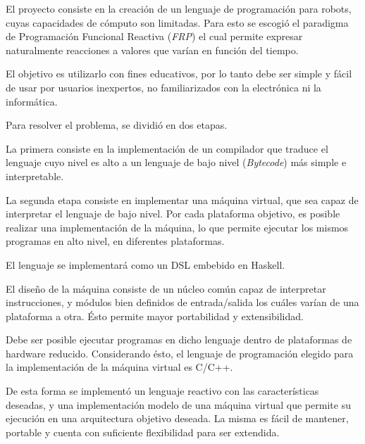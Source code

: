 

El proyecto consiste en la creación de un lenguaje de programación
para robots, cuyas capacidades de cómputo son limitadas.
Para esto se escogió el paradigma de Programación Funcional Reactiva
(\emph{FRP}) el cual permite expresar naturalmente reacciones a
valores que varían en función del tiempo.

El objetivo es utilizarlo con fines educativos,
por lo tanto debe ser simple y fácil de usar por usuarios
inexpertos, no familiarizados con la electrónica ni la informática.

Para resolver el problema, se dividió en dos etapas.

La primera consiste en la implementación de
un compilador que traduce el lenguaje cuyo nivel es alto a
un lenguaje de bajo nivel (\emph{Bytecode}) más simple e interpretable.

La segunda etapa consiste en implementar una máquina virtual, que
sea capaz de interpretar el lenguaje de bajo nivel.
Por cada plataforma objetivo, es posible realizar una implementación de
la máquina, lo que permite ejecutar los mismos
programas en alto nivel, en diferentes plataformas.

El lenguaje se implementará como un DSL embebido en Haskell.

El diseño de la máquina consiste de un núcleo común capaz de interpretar
instrucciones, y módulos bien definidos de
entrada/salida los cuáles varían de una plataforma a otra.
Ésto permite mayor portabilidad y extensibilidad.

Debe ser posible ejecutar programas en dicho lenguaje dentro de plataformas
de hardware reducido.
Considerando ésto, el lenguaje de programación elegido para la
implementación de la máquina virtual es C/C++.

De esta forma se implementó un lenguaje reactivo con las
características deseadas, y una implementación modelo de una máquina
virtual que permite
su ejecución en una arquitectura objetivo deseada.
La misma es fácil de mantener, portable y cuenta con suficiente
flexibilidad para ser extendida.
